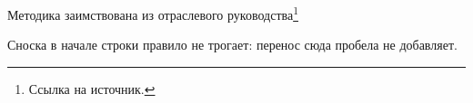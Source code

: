 Методика заимствована из отраслевого руководства\footnote{Ссылка на источник.}

Сноска в начале строки правило не трогает: перенос сюда пробела не добавляет.
